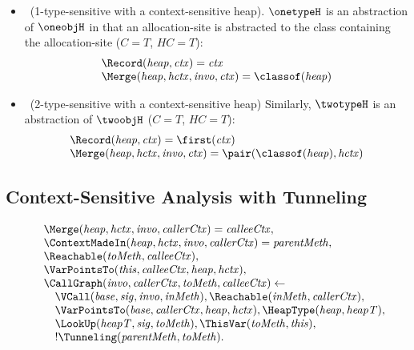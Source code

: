 {\begin{itemize}
\item {\onetypeH~(1-type-sensitive with a context-sensitive heap)}. 
$\onetypeH$ is an abstraction of $\oneobjH$ in that an allocation-site
is abstracted to the class containing the
allocation-site ($C =T$, $HC=T$): 
\[
\begin{array}{l}
\Record ({\it heap}, {\it ctx}) = {\it ctx}\\
\Merge ({\it heap, hctx, invo, ctx}) = \classof({\it heap}) \\
\end{array}
\]


\item {\twotypeH~(2-type-sensitive with a context-sensitive heap)}
Similarly, $\twotypeH$ is an abstraction of $\twoobjH$ ($C = T$, $HC=T$): 
\[
\begin{array}{l}
\Record ({\it heap}, {\it ctx}) = \first({\it ctx})\\
\Merge ({\it heap, hctx, invo, ctx}) = \pair(\classof({\it heap}), {\it hctx}) \\
\end{array}
\]
\end{itemize}




\subsection{Context-Sensitive Analysis with Tunneling}
\begin{figure}[t]
\[
\begin{array}{l}

  \Merge ({\it heap}, {\it hctx}, {\it invo}, {\it callerCtx}) = {\it calleeCtx}, \\
  \ContextMadeIn ({\it heap}, {\it hctx}, {\it invo}, {\it callerCtx}) = {\it parentMeth}, \\
  \Reachable ({\it toMeth}, {\it calleeCtx}), \\
  \VarPointsTo ({\it this}, {\it calleeCtx}, {\it heap}, {\it hctx}), \\
  \CallGraph ({\it invo}, {\it callerCtx}, {\it toMeth}, {\it calleeCtx})
  \leftarrow \\
    \quad \VCall ({\it base}, {\it sig}, {\it invo}, {\it inMeth}), 
     \Reachable ({\it inMeth}, {\it callerCtx}), \\
   \quad \VarPointsTo ({\it base}, {\it callerCtx}, {\it heap}, {\it hctx}), 
  \HeapType({\it heap}, {\it heapT}), \\
  \quad \LookUp ({\it heapT}, {\it sig}, {\it toMeth}),
  \ThisVar ({\it toMeth}, {\it this}),  \\
\quad  !\Tunneling({\it parentMeth}, {\it toMeth}).\\[1em]



\end{array}\]
\end{figure}}

